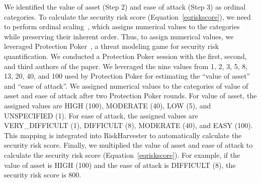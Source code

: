 We identified the value of asset (Step 2) and ease of attack (Step 3) as ordinal categories. To calculate the security risk score (Equation~\ref{eqriskscore}), we need to perform ordinal scaling~\cite{agresti2012categorical}, which assigns numerical values to the categories while preserving their inherent order. Thus, to assign numerical values, we leveraged Protection Poker~\cite{williams2010protection}, a threat modeling game for security risk quantification. We conducted a Protection Poker session with the first, second, and third authors of the paper. We leveraged the nine values from 1, 2, 3, 5, 8, 13, 20, 40, and 100 used by Protection Poker for estimating the ``value of asset'' and ``ease of attack''. We assigned numerical values to the categories of value of asset and ease of attack after two Protection Poker rounds. For value of asset, the assigned values are HIGH (100), MODERATE (40), LOW (5), and UNSPECIFIED (1). For ease of attack, the assigned values are VERY\_DIFFICULT (1), DIFFICULT (8), MODERATE (40), and EASY (100). This mapping is integrated into RiskHarvester to automatically calculate the security risk score. Finally, we multiplied the value of asset and ease of attack to calculate the security risk score (Equation~\ref{eqriskscore}). For example, if the value of asset is HIGH (100) and the ease of attack is DIFFICULT (8), the security risk score is 800. 



 
